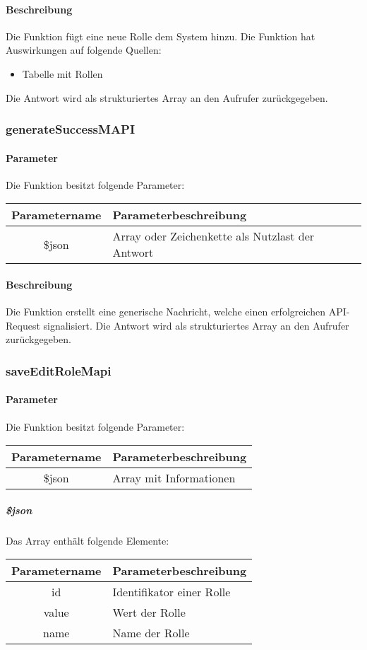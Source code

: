 \paragraph{Beschreibung} Die Funktion fügt eine neue Rolle dem System hinzu. Die Funktion hat Auswirkungen auf folgende Quellen:
\begin{itemize}
	\item Tabelle mit Rollen
\end{itemize}
Die Antwort wird als strukturiertes Array an den Aufrufer zurückgegeben.
\subsubsection{generateSuccessMAPI}
\paragraph{Parameter} Die Funktion besitzt folgende Parameter:
\begin{table}[H]
	\begin{tabular}{|c|p{11cm}|}
		\hline
		\textbf{Parametername} & \textbf{Parameterbeschreibung} \\ \hline
		\$json & Array oder Zeichenkette als Nutzlast der Antwort \\ \hline
	\end{tabular}
\end{table}
\paragraph{Beschreibung} Die Funktion erstellt eine generische Nachricht, welche einen erfolgreichen API-Request signalisiert. Die Antwort wird als strukturiertes Array an den Aufrufer zurückgegeben.
\subsubsection{saveEditRoleMapi}
\paragraph{Parameter} Die Funktion besitzt folgende Parameter:
\begin{table}[H]
	\begin{tabular}{|c|p{11cm}|}
		\hline
		\textbf{Parametername} & \textbf{Parameterbeschreibung} \\ \hline
		\$json & Array mit Informationen \\ \hline
	\end{tabular}
\end{table}
\subparagraph{\$json}Das Array enthält folgende Elemente:
\begin{table}[H]
	\begin{tabular}{|c|p{11cm}|}
		\hline
		\textbf{Parametername} & \textbf{Parameterbeschreibung} \\ \hline
		id    & Identifikator einer Rolle \\ \hline
		value & Wert der Rolle \\ \hline
		name  & Name der Rolle \\ \hline
	\end{tabular}
\end{table}
